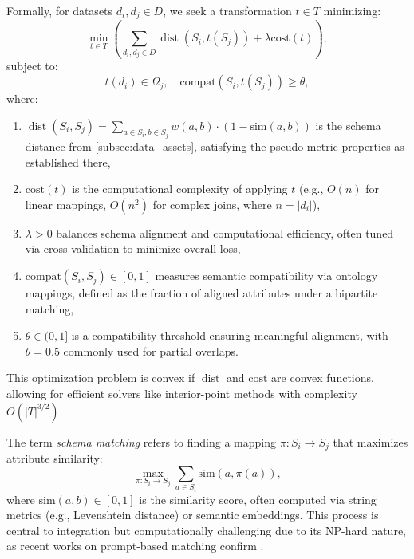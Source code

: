 \documentclass{amsart}
\DeclareMathOperator\dist{dist}
\begin{document}
Formally, for datasets \( d_i, d_j \in D \), we seek a transformation \( t \in T \) minimizing:
\[
\min_{t \in T} \left( \sum_{d_i, d_j \in D} \dist(S_i, t(S_j)) + \lambda \text{cost}(t) \right),
\]
subject to:
\[
t(d_i) \in \Omega_j, \quad \text{compat}(S_i, t(S_j)) \geq \theta,
\]
where:
\begin{enumerate}
    \item \( \dist(S_i, S_j) = \sum_{a \in S_i, b \in S_j} w(a, b) \cdot (1 - \text{sim}(a, b)) \) is the schema distance from \cref{subsec:data_assets}, satisfying the pseudo-metric properties as established there,
    \item \( \text{cost}(t) \) is the computational complexity of applying \( t \) (e.g., \( O(n) \) for linear mappings, \( O(n^2) \) for complex joins, where \( n = |d_i| \)),
    \item \( \lambda > 0 \) balances schema alignment and computational efficiency, often tuned via cross-validation to minimize overall loss,
    \item \( \text{compat}(S_i, S_j) \in [0, 1] \) measures semantic compatibility via ontology mappings, defined as the fraction of aligned attributes under a bipartite matching,
    \item \( \theta \in (0, 1] \) is a compatibility threshold ensuring meaningful alignment, with \( \theta = 0.5 \) commonly used for partial overlaps.
\end{enumerate}

This optimization problem is convex if \( \dist \) and \( \text{cost} \) are convex functions, allowing for efficient solvers like interior-point methods with complexity \( O(|T|^{3/2}) \).

The term \emph{schema matching} refers to finding a mapping \( \pi: S_i \to S_j \) that maximizes attribute similarity:
\[
\max_{\pi: S_i \to S_j} \sum_{a \in S_i} \text{sim}(a, \pi(a)),
\]
where \( \text{sim}(a, b) \in [0, 1] \) is the similarity score, often computed via string metrics (e.g., Levenshtein distance) or semantic embeddings. This process is central to integration but computationally challenging due to its NP-hard nature, as recent works on prompt-based matching confirm \cite{arxiv2408promptmatcher}.
\end{document}
